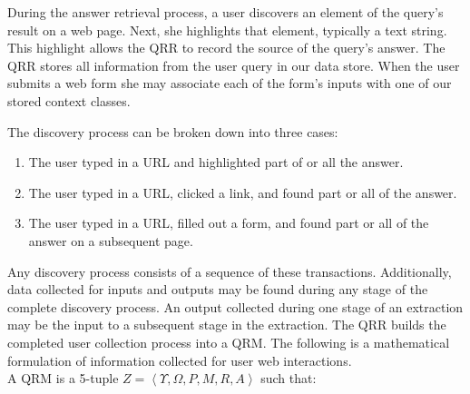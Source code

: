 \documentclass{IOS-Book-Article}
\begin{document}
During the answer retrieval process, a user discovers an element of the query's result on a web page.  Next, she highlights that element, typically a text string.  This highlight allows the QRR to record the source of  the query's answer.  The QRR stores all information from the user query in our data store.  When the user submits a web form she may associate each of the form's inputs with one of our stored context classes. 

The discovery process can be broken down into three cases:
\begin{enumerate}
\item The user typed in a URL  and highlighted part of or all the answer. 
\item The user typed in a URL, clicked a link, and found part or all of the answer. 
\item The user typed in a URL, filled out a form, and found part or all of the answer on a subsequent page. 
\end{enumerate}

Any discovery process  consists of a sequence of these transactions.  Additionally, data collected for inputs and outputs may be found during any stage of the complete discovery process.  An output collected during one stage of an extraction may be the input to a subsequent stage in the extraction.  The QRR builds the completed user collection process into a QRM.  The following is a mathematical formulation of information collected for user web interactions.\\

A QRM is a 5-tuple $Z = \left< \Upsilon, \Omega, P, M, R, A \right>$ such that:
\end{document}
